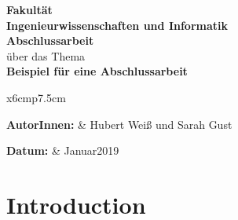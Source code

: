 \documentclass{article}
\begin{document}
\thispagestyle{empty}
\begin{center}
	\vspace*{2cm}
	\Large
	\textbf{Fakultät}\\
	\textbf{Ingenieurwissenschaften und Informatik}\\
	\vspace*{2cm}
	\Huge
	\textbf{Abschlussarbeit}\\
	\vspace*{0.5cm}
	\large
	über das Thema\\
	\vspace*{1cm}
	\textbf{Beispiel für eine Abschlussarbeit}\\
	\vspace*{2cm}
	
	\vfill
	\normalsize

	\begin{tabular}{x{6cm}p{7.5cm}}
		\rule{0mm}{5ex}\textbf{AutorInnen:} & Hubert Weiß und Sarah Gust \\ 
		\rule{0mm}{5ex}\textbf{Datum:} & Januar2019 \\ 
	\end{tabular} 
\end{center}
\pagebreak




\section{Introduction}



\end{document}
